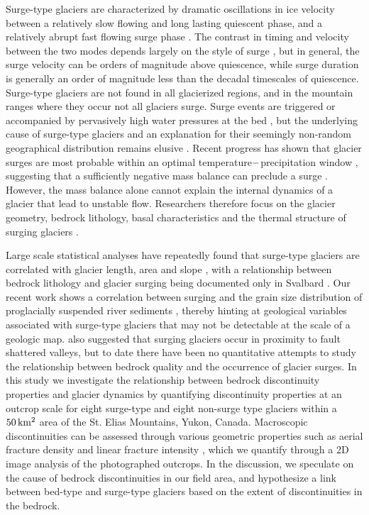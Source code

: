 \documentclass[draft,linenumbers]{agujournal}
\begin{document}
Surge-type glaciers are characterized by dramatic oscillations in ice velocity between a relatively slow flowing and long lasting quiescent phase, and a relatively abrupt fast flowing surge phase \citep{Meier1969}. The contrast in timing and velocity between the two modes depends largely on the style of surge \citep[e.g.][]{Murray2003}, but in general, the surge velocity can be orders of magnitude above quiescence, while surge duration is generally an order of magnitude less than the decadal timescales of quiescence. Surge-type glaciers are not found in all glacierized regions, and in the mountain ranges where they occur not all glaciers surge. Surge events are triggered or accompanied by pervasively high water pressures at the bed \citep{Kamb1985}, but the underlying cause of surge-type glaciers and an explanation for their seemingly non-random geographical distribution remains elusive \citep{Harrison2003}. Recent progress has shown that glacier surges are most probable within an optimal temperature$\--$precipitation window \citep{Sevestre2015}, suggesting that a sufficiently negative mass balance can preclude a surge \citep[e.g.][]{Dowdeswell1995,Kienholz2016}. However, the mass balance alone cannot explain the internal dynamics of a glacier that lead to unstable flow. Researchers therefore focus on the glacier geometry, bedrock lithology, basal characteristics and the thermal structure of surging glaciers \citep[e.g.][]{Clarke1984,Clarke1986,Hamilton1996,Sharp1994}. 

Large scale statistical analyses have repeatedly found that surge-type glaciers are correlated with glacier length, area and slope \citep[e.g.][]{Clarke1986,Hamilton1996,Jiskoot1998,Sevestre2015}, with a relationship between bedrock lithology and glacier surging being documented only in Svalbard \citep[e.g.][]{Hamilton1996,Jiskoot1998}. Our recent work shows  a correlation between surging and the grain size distribution of proglacially suspended river sediments \citep{Crompton2016}, thereby hinting at geological variables associated with surge-type glaciers that may not be detectable at the scale of a geologic map. \cite{Post1969} also suggested that surging glaciers occur in proximity to fault shattered valleys, but to date there have been no quantitative attempts to study the relationship between bedrock quality and the occurrence of glacier surges. In this study we investigate the relationship between bedrock discontinuity properties and glacier dynamics by quantifying discontinuity properties at an outcrop scale for eight surge-type and eight non-surge type glaciers within a $\rm 50\,km^2$ area of the St. Elias Mountains, Yukon, Canada. Macroscopic discontinuities can be assessed through various geometric properties such as aerial fracture density and linear fracture intensity \citep{Priest2012}, which we quantify through a 2D image analysis of the photographed outcrops. In the discussion, we speculate on the cause of bedrock discontinuities in our field area, and hypothesize a link between bed-type and surge-type glaciers based on the extent of discontinuities in the bedrock.   
\end{document}

